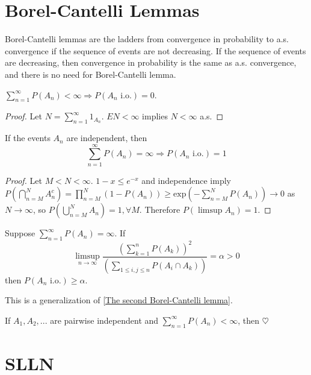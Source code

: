 \section{Borel-Cantelli Lemmas}
Borel-Cantelli lemmas are the ladders from convergence in probability to a.s. convergence if the sequence of events are not decreasing.
If the sequence of events are decreasing, then convergence in probability is the same as a.s. convergence, and there is no need for Borel-Cantelli lemma.
\begin{theorem}
$\sum_{n=1}^\infty P(A_n)<\infty\Longrightarrow P(A_n\text{ i.o.})=0$.
\end{theorem}
\begin{proof}
Let $N=\sum_{n=1}^\infty 1_{A_n}$. $EN<\infty$ implies $N<\infty$ a.s.
\end{proof}
\begin{theorem}\label{The second Borel-Cantelli lemma}
If the events $A_n$ are independent, then \[\sum_{n=1}^\infty P(A_n)=\infty\Longrightarrow P(A_n\text{ i.o.})=1\]
\end{theorem}
\begin{proof}
Let $M<N<\infty$. $1-x\le e^{-x}$ and independence imply $P(\bigcap_{n=M}^{N}A_n^c)=\prod_{n=M}^N(1-P(A_n))\ge \text{exp}(-\sum_{n=M}^NP(A_n))\to 0$ as $N\to\infty$, so $P(\bigcup_{n=M}^{N}A_n)=1,\forall M$. Therefore $P(\limsup A_n)=1$.
\end{proof}
\begin{theorem}
Suppose $\sum_{n=1}^\infty P(A_n)=\infty$. If 
\[\limsup_{n\to\infty}\frac{(\sum_{k=1}^nP(A_k))^2}{(\sum_{1\le i,j\le n} P(A_i\cap A_k))}=\alpha>0\] then $P(A_n\text{ i.o.})\ge\alpha$.
\end{theorem}
\begin{remark}
This is a generalization of \ref{The second Borel-Cantelli lemma}.
\end{remark}
\begin{theorem}
If $A_1,A_2,...$ are pairwise independent and $\sum_{n=1}^\infty P(A_n)<\infty$, then $\heartsuit$
\end{theorem}
\section{SLLN}
